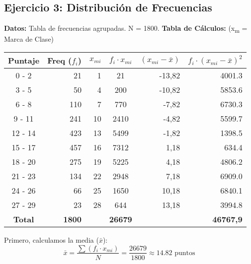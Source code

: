 \documentclass[10pt, a4paper]{article}
\newcommand{\mean}[1]{\ensuremath{\bar{#1}}} %
\begin{document}
\subsection*{Ejercicio 3: Distribución de Frecuencias}
\textbf{Datos:} Tabla de frecuencias agrupadas. N = \num{1800}.
\textbf{Tabla de Cálculos:} (x\textsubscript{m} = Marca de Clase)

\centering
\begin{tabular}{crrcrr}
\toprule
Puntaje & Freq ($f_i$) & $x_{mi}$ & $f_i \cdot x_{mi}$ & $(x_{mi} - \mean{x})$ & $f_i \cdot (x_{mi} - \mean{x})^2$ \\
\midrule
0 - 2   & 21       & 1  & 21       & -13,82 & \num{4001,3} \\
3 - 5   & 50       & 4  & 200      & -10,82 & \num{5853,6} \\
6 - 8   & 110      & 7  & 770      & -7,82 & \num{6730,3} \\
9 - 11  & 241      & 10 & 2410     & -4,82 & \num{5599,7} \\
12 - 14 & 423      & 13 & 5499     & -1,82 & \num{1398,5} \\
15 - 17 & 457      & 16 & 7312     & 1,18 & \num{634,4} \\
18 - 20 & 275      & 19 & 5225     & 4,18 & \num{4806,2} \\
21 - 23 & 134      & 22 & 2948     & 7,18 & \num{6909,0} \\
24 - 26 & 66       & 25 & 1650     & 10,18 & \num{6840,1} \\
27 - 29 & 23       & 28 & 644      & 13,18 & \num{3994,8} \\
\midrule
\textbf{Total} & \textbf{1800} &    & \textbf{26679} & & \textbf{46767,9} \\
\bottomrule
\end{tabular}

\vspace{1ex}
Primero, calculamos la media (\mean{x}):
\[ \mean{x} = \frac{\sum (f_i \cdot x_{mi})}{N} = \frac{\num{26679}}{\num{1800}} \approx \num{14,82} \text{ puntos} \]
\end{document}
